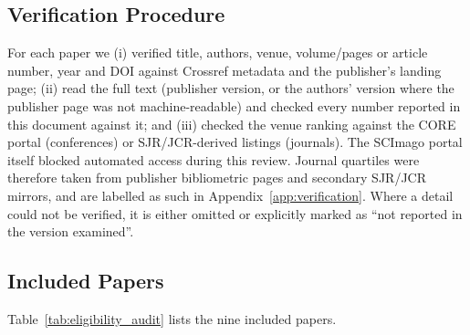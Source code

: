\documentclass[11pt,a4paper]{article}
\begin{document}
\subsection{Verification Procedure}
For each paper we (i) verified title, authors, venue, volume/pages or article number, year and DOI against Crossref metadata and the publisher's landing page; (ii) read the full text (publisher version, or the authors' version where the publisher page was not machine-readable) and checked every number reported in this document against it; and (iii) checked the venue ranking against the CORE portal (conferences) or SJR/JCR-derived listings (journals). The SCImago portal itself blocked automated access during this review. Journal quartiles were therefore taken from publisher bibliometric pages and secondary SJR/JCR mirrors, and are labelled as such in Appendix~\ref{app:verification}. Where a detail could not be verified, it is either omitted or explicitly marked as ``not reported in the version examined''.

\subsection{Included Papers}
Table~\ref{tab:eligibility_audit} lists the nine included papers.
\end{document}
